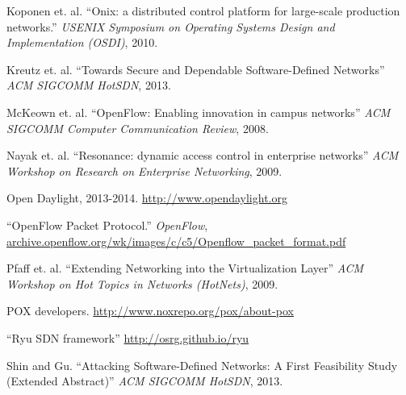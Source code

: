 {\begin{thebibliography}{99}
 Koponen et. al. ``Onix: a distributed control platform for large-scale production networks.'' \emph{USENIX Symposium on Operating Systems Design and Implementation (OSDI)}, 2010.

 Kreutz et. al. ``Towards Secure and Dependable Software-Defined Networks'' \emph{ACM SIGCOMM HotSDN}, 2013.

 McKeown et. al. ``OpenFlow: Enabling innovation in campus networks'' \emph{ACM SIGCOMM Computer Communication Review}, 2008.

 Nayak et. al. ``Resonance: dynamic access control in enterprise networks'' \emph{ACM Workshop on Research on Enterprise Networking}, 2009.

 Open Daylight, 2013-2014. \url{http://www.opendaylight.org}

 ``OpenFlow Packet Protocol.'' \emph{OpenFlow}, \url{archive.openflow.org/wk/images/c/c5/Openflow_packet_format.pdf}

 Pfaff et. al. ``Extending Networking into the Virtualization Layer'' \emph{ACM Workshop on Hot Topics in Networks (HotNets)}, 2009.

 POX developers. \url{http://www.noxrepo.org/pox/about-pox}


 ``Ryu SDN framework'' \url{http://osrg.github.io/ryu}

 Shin and Gu. ``Attacking Software-Defined Networks: A First Feasibility Study (Extended Abstract)'' \emph{ACM SIGCOMM HotSDN}, 2013.


\end{thebibliography}
}
